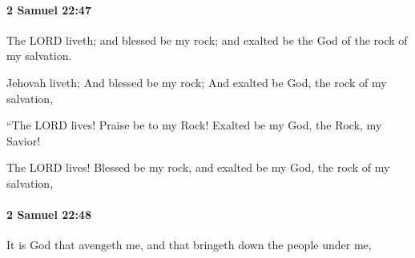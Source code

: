 		\paragraph{2 Samuel 22:47} %
			\label{2SAMUEL-22-47}

			The LORD liveth; and blessed be my rock; and exalted be the God of the rock of my salvation.

			\begin{versebox}
					\item[BHS] 
					\item[ASV] Jehovah liveth; And blessed be my rock; And exalted be God, the rock of my salvation,
					\item[NIV] “The LORD lives! Praise be to my Rock! Exalted be my God, the Rock, my Savior!
					\item[NRSV] The LORD lives! Blessed be my rock, and exalted be my God, the rock of my salvation,
			\end{versebox}

		\paragraph{2 Samuel 22:48} %
			\label{2SAMUEL-22-48}

			It is God that avengeth me, and that bringeth down the people under me,

